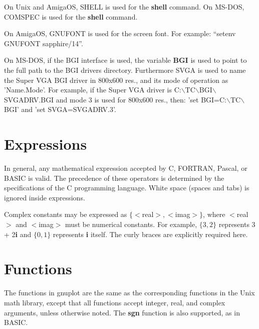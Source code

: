 On Unix and AmigaOS, SHELL is used for the {\bf shell} command. On MS-DOS,
COMSPEC is used for the {\bf shell} command.

On AmigaOS, GNUFONT is used for the screen font.  For example:
``setenv GNUFONT sapphire/14''.

On MS-DOS, if the BGI interface is used, the variable {\bf BGI} is used to point
to the full path to the BGI drivers directory. Furthermore SVGA is used to
name the Super VGA BGI driver in 800x600 res., and its mode of operation
as 'Name.Mode'.
For example, if the Super VGA driver is C:$\backslash$TC$\backslash$BGI$\backslash$SVGADRV.BGI and mode 3 is
used for 800x600 res., then: 'set BGI=C:$\backslash$TC$\backslash$BGI' and 'set SVGA=SVGADRV.3'.


\section{Expressions}
In general, any mathematical expression accepted by C, FORTRAN,
Pascal, or BASIC is valid. The precedence of these operators is
determined by the specifications of the C programming language.
White space (spaces and tabs) is ignored inside expressions.

Complex constants may be expressed as $\{<$real$>,<$imag$>\}$, where
$<$real$>$ and $<$imag$>$ must be numerical constants.  For example,
$\{3,2\}$ represents 3 + 2{\bf i} and $\{0,1\}$ represents {\bf i}
itself.  The curly braces are explicitly required here.
\section{Functions}
The functions in gnuplot are the same as the corresponding functions
in the Unix math library, except that all functions accept integer,
real, and complex arguments, unless otherwise noted. The {\bf sgn}
function is also supported, as in BASIC.


